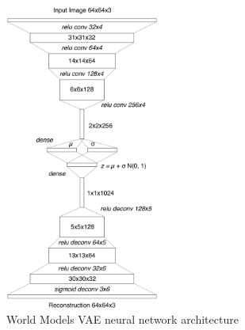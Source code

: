 \begin{figure}[H]
\includegraphics[width=0.45\textwidth,keepaspectratio]{figures/WorldModels/world_models_vae_architecture.png}
\caption{World Models VAE neural network architecture \cite{Algo.WorldModels}}
\label{Fig.WorldModelsVAEArchitecture}
\end{figure}

